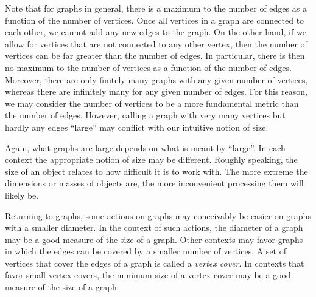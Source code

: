 Note that for graphs in general, there is a maximum to the number of edges as a function of the number of vertices.
Once all vertices in a graph are connected to each other, we cannot add any new edges to the graph.
On the other hand, if we allow for vertices that are not connected to any other vertex, then the number of vertices can be far greater than the number of edges.
In particular, there is then no maximum to the number of vertices as a function of the number of edges.
Moreover, there are only finitely many graphs with any given number of vertices, whereas there are infinitely many for any given number of edges.
For this reason, we may consider the number of vertices to be a more fundamental metric than the number of edges.
However, calling a graph with very many vertices but hardly any edges \enquote{large} may conflict with our intuitive notion of size.

Again, what graphs are large depends on what is meant by \enquote{large}.
In each context the appropriate notion of size may be different.
Roughly speaking, the size of an object relates to how difficult it is to work with.
The more extreme the dimensions or masses of objects are, the more inconvenient processing them will likely be.

Returning to graphs, some actions on graphs may conceivably be easier on graphs with a smaller diameter.
In the context of such actions, the diameter of a graph may be a good measure of the size of a graph.
Other contexts may favor graphs in which the edges can be covered by a smaller number of vertices.
A set of vertices that cover the edges of a graph is called a \emph{vertex cover}.
In contexts that favor small vertex covers, the minimum size of a vertex cover may be a good measure of the size of a graph.

